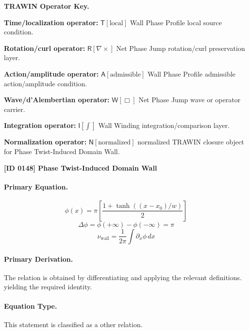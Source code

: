 \par\vspace{0.45\baselineskip}
\noindent\begin{minipage}[t]{\linewidth}
\begingroup
\small
\raggedright
\textbf{TRAWIN Operator Key.}\par
\noindent\textbf{Time/localization operator:} $\mathsf{T}\!\left[\mathrm{local}\right]$ Wall Phase Profile local source condition.\par
\noindent\textbf{Rotation/curl operator:} $\mathsf{R}\!\left[\nabla\times\right]$ Net Phase Jump rotation/curl preservation layer.\par
\noindent\textbf{Action/amplitude operator:} $\mathsf{A}\!\left[\mathrm{admissible}\right]$ Wall Phase Profile admissible action/amplitude condition.\par
\noindent\textbf{Wave/d'Alembertian operator:} $\mathsf{W}\!\left[\Box\right]$ Net Phase Jump wave or operator carrier.\par
\noindent\textbf{Integration operator:} $\mathsf{I}\!\left[\int\right]$ Wall Winding integration/comparison layer.\par
\noindent\textbf{Normalization operator:} $\mathsf{N}\!\left[\mathrm{normalized}\right]$ normalized TRAWIN closure object for Phase Twist-Induced Domain Wall.\par
\endgroup
\end{minipage}

\clearpage
\noindent\textbf{[ID 0148] Phase Twist-Induced Domain Wall}\par
\vspace{0.35em}
\paragraph{Primary Equation.}
\[
\phi(x)=\pi\left[\frac{1+\tanh((x-x_0)/w)}{2}\right]
\]
\[
\Delta\phi = \phi(+\infty)-\phi(-\infty)=\pi
\]
\[
\nu_{\mathrm{wall}}=\frac{1}{2\pi}\int \partial_x\phi\,dx
\]

\paragraph{Primary Derivation.}
The relation is obtained by differentiating and applying the relevant definitions. yielding the required identity.
\paragraph{Equation Type.}
This statement is classified as a other relation.

